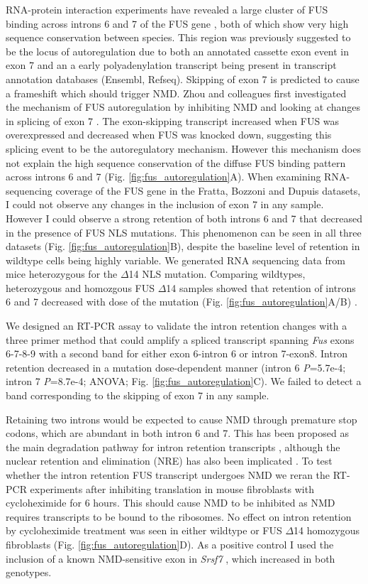 RNA-protein interaction experiments have revealed a large cluster of FUS binding across introns 6 and 7 of the FUS gene \citep{Lagier-Tourenne2012}, both of which show very high sequence conservation between species.
This region was previously suggested to be the locus of autoregulation due to both an annotated cassette exon event in exon 7 and an a early polyadenylation transcript being present in transcript annotation databases (Ensembl, Refseq).
Skipping of exon 7 is predicted to cause a frameshift which should trigger NMD. 
Zhou and colleagues first investigated the mechanism of FUS autoregulation by inhibiting NMD and looking at changes in splicing of exon 7 \citep{Zhou2013}.
The exon-skipping transcript increased when FUS was overexpressed and decreased when FUS was knocked down, suggesting this splicing event to be the autoregulatory mechanism.
However this mechanism does not explain the high sequence conservation of the diffuse FUS binding pattern across introns 6 and 7 (Fig. \ref{fig:fus_autoregulation}A).
When examining RNA-sequencing coverage of the FUS gene in the Fratta, Bozzoni and Dupuis datasets, I could not observe any changes in the inclusion of exon 7 in any sample.
However I could observe a strong retention of both introns 6 and 7 that decreased in the presence of FUS NLS mutations. 
This phenomenon can be seen in all three datasets (Fig. \ref{fig:fus_autoregulation}B), despite the baseline level of retention in wildtype cells being highly variable. 
We generated RNA sequencing data from mice heterozygous for the $\Delta$14 NLS mutation. 
Comparing wildtypes, heterozygous and homozgous FUS $\Delta$14 samples showed that retention of introns 6 and 7 decreased with dose of the mutation (Fig. \ref{fig:fus_autoregulation}A/B) .

We designed an RT-PCR assay to validate the intron retention changes with a three primer method that could amplify a spliced transcript spanning \textit{Fus} exons 6-7-8-9 with a second band for either exon 6-intron 6 or intron 7-exon8. 
Intron retention decreased in a mutation dose-dependent manner (intron 6 \textit{P}=5.7e-4; intron 7 \textit{P}=8.7e-4; ANOVA; Fig. \ref{fig:fus_autoregulation}C).
We failed to detect a band corresponding to the skipping of exon 7 in any sample. 

Retaining two introns would be expected to cause NMD through premature stop codons, which are abundant in both intron 6 and 7. 
This has been proposed as the main degradation pathway for intron retention transcripts \citep{Wong2013}, although the  nuclear retention and elimination (NRE) has also been implicated \citep{Yap2013}. 
To test whether the intron retention FUS transcript undergoes NMD we reran the RT-PCR experiments after inhibiting translation in mouse fibroblasts with cycloheximide for 6 hours.
This should cause NMD to be inhibited as NMD requires transcripts to be bound to the ribosomes.
No effect on intron retention by cycloheximide treatment was seen in either wildtype or FUS $\Delta$14 homozygous fibroblasts (Fig. \ref{fig:fus_autoregulation}D).
As a positive control I used the inclusion of a known NMD-sensitive exon in \textit{Srsf7} \citep{Edwards2016}, which increased in both genotypes. 

